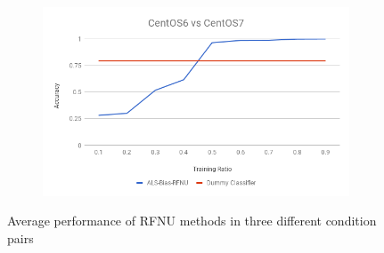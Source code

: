 \documentclass[10pt, conference, compsocconf]{IEEEtran}
\begin{document}
\begin{figure}[h!]
\begin{subfigure}[b]{0.8\linewidth}
                \includegraphics[width=\columnwidth]{figures/ALS-Bias/RFNU-ALS-Bias-6vs7-PFS}
        \end{subfigure}
        \caption{Average performance of RFNU methods in three different condition pairs}
        \label{fig:RFNU method}
\end{figure}
\end{document}
